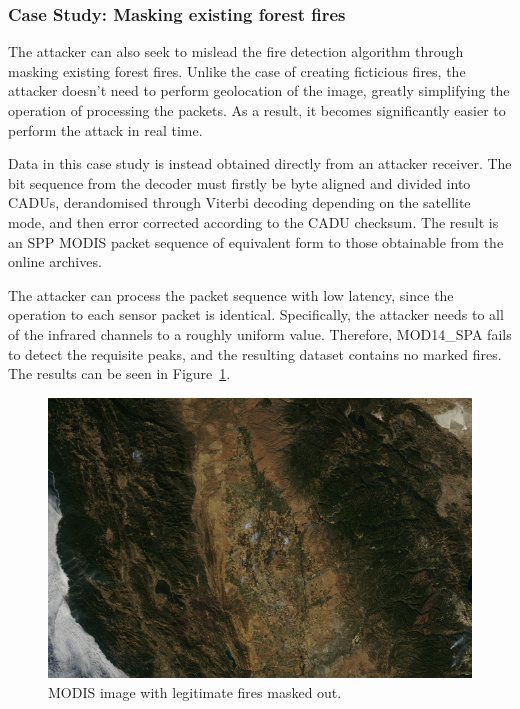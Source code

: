 
\subsubsection{Case Study: Masking existing forest fires}

The attacker can also seek to mislead the fire detection algorithm through masking existing forest fires.
Unlike the case of creating ficticious fires, the attacker doesn't need to perform geolocation of the image, greatly simplifying the operation of processing the packets.
As a result, it becomes significantly easier to perform the attack in real time.

Data in this case study is instead obtained directly from an attacker receiver.
The bit sequence from the decoder must firstly be byte aligned and divided into CADUs, derandomised through Viterbi decoding depending on the satellite mode, and then error corrected according to the CADU checksum.
The result is an SPP MODIS packet sequence of equivalent form to those obtainable from the online archives.

The attacker can process the packet sequence with low latency, since the operation to each sensor packet is identical.
Specifically, the attacker needs to all of the infrared channels to a roughly uniform value.
Therefore, MOD14\_SPA fails to detect the requisite peaks, and the resulting dataset contains no marked fires.
The results can be seen in Figure~\ref{fig:injection-masked}.

\begin{figure}
    \includegraphics[width=\columnwidth]{diagrams/injection/masked_0.jpg}
    \caption{MODIS image with legitimate fires masked out.}
    \label{fig:injection-masked}
\end{figure}

